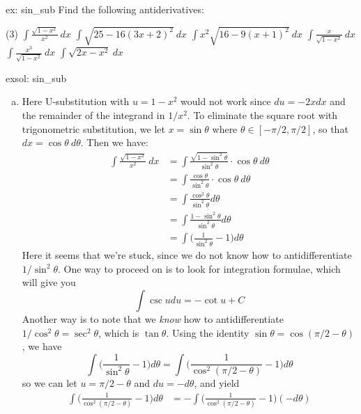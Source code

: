 \allowdisplaybreaks
\begin{ex}[]{ex: sin_sub}
    Find the following antiderivatives:
    \begin{tasks}(3)
        \task $\int \frac{\sqrt{1-x^2}}{x^2}~dx$
        \task $\int \sqrt{25-16(3x+2)^2}~dx$
        \task $\int x^2\sqrt{16-9(x+1)^2}~dx$
        \task $\int \frac{x}{\sqrt{1-x^2}}~dx$
        \task $\int \frac{x^3}{\sqrt{1-x^2}}~dx$
        \task $\int \sqrt{2x-x^2}~dx$
    \end{tasks}
\end{ex}
\begin{exsol}[]{exsol: sin_sub}
    \begin{enumerate}[a)]
        \item Here U-substitution with $u = 1-x^2$ would not work since $du = -2xdx$ and the remainder of the integrand in $1/x^2$.  To eliminate the square root with trigonometric substitution, we let $x = \sin \theta$ where $\theta \in [-\pi/2, \pi/2]$, so that $dx = \cos \theta~d\theta$.  Then we have:
        \begin{align*}
            \int \frac{\sqrt{1-x^2}}{x^2}~dx &= \int \frac{\sqrt{1-\sin^2 \theta}}{\sin^2\theta} \cdot \cos\theta~d\theta\\
            &= \int \frac{\cos \theta}{\sin^2\theta} \cdot \cos\theta~d\theta\\
            &= \int \frac{\cos^2 \theta}{\sin^2\theta} d\theta\\
            &= \int \frac{1-\sin^2\theta}{\sin^2\theta} d\theta\\
            &= \int \Big(\frac{1}{\sin^2\theta} - 1\Big) d\theta
        \end{align*}
        Here it seems that we're stuck, since we do not know how to antidifferentiate $1/\sin^2\theta$.  One way to proceed on is to look for integration formulae, which will give you 
        \[\int \csc u du = -\cot u + C\]
        Another way is to note that we \textit{know} how to antidifferentiate $1/\cos^2\theta = \sec^2\theta$, which is $\tan\theta$.  Using the identity $\sin \theta = \cos (\pi/2 - \theta)$, we have 
        \[ \int \Big(\frac{1}{\sin^2\theta} - 1\Big) d\theta =  \int \Big(\frac{1}{\cos^2(\pi/2 - \theta)} - 1\Big) d\theta\]
        so we can let $u = \pi/2 - \theta$ and $du = -d\theta$, and yield
        \begin{align*}
            \int \Big(\frac{1}{\cos^2(\pi/2 - \theta)} - 1\Big) d\theta &= -\int \Big(\frac{1}{\cos^2(\pi/2 - \theta)} - 1\Big) (-d\theta)\\

\end{align*}
\end{enumerate}
\end{exsol}
